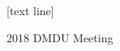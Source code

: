 \def\begincols{\begin{columns}}
\def\begincol{\begin{column}}
\def\endcol{\end{column}}
\def\endcols{\end{columns}}





[text line]{%
  \parbox{\linewidth}{\vspace*{-8pt}2018 DMDU Meeting\hfill\insertshortauthor\hfill\insertpagenumber}}

